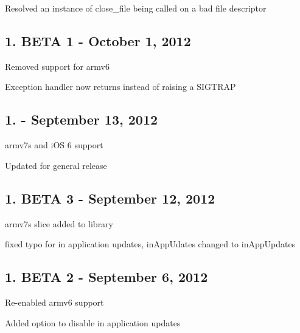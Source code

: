 \begin{DoxyItemize}
\item Resolved an instance of close\-\_\-file being called on a bad file descriptor
\end{DoxyItemize}

\subsection*{1. B\-E\-T\-A 1 -\/ October 1, 2012}


\begin{DoxyItemize}
\item Removed support for armv6
\item Exception handler now returns instead of raising a S\-I\-G\-T\-R\-A\-P
\end{DoxyItemize}

\subsection*{1. -\/ September 13, 2012}


\begin{DoxyItemize}
\item armv7s and i\-O\-S 6 support
\item Updated for general release
\end{DoxyItemize}

\subsection*{1. B\-E\-T\-A 3 -\/ September 12, 2012}


\begin{DoxyItemize}
\item armv7s slice added to library
\item fixed typo for in application updates, in\-App\-Udates changed to in\-App\-Updates
\end{DoxyItemize}

\subsection*{1. B\-E\-T\-A 2 -\/ September 6, 2012}


\begin{DoxyItemize}
\item Re-\/enabled armv6 support
\item Added option to disable in application updates
\end{DoxyItemize}

